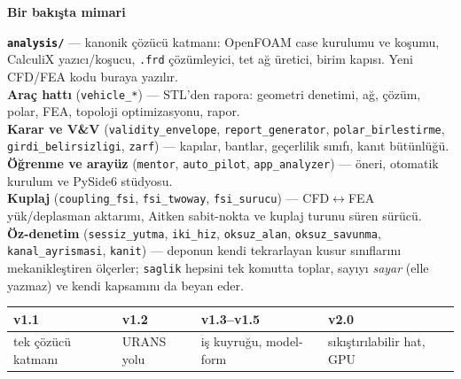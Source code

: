 \documentclass[11pt,a4paper]{article}
\newcommand{\kkkenar}{lacivert}
\newcommand{\kkzemin}{kod}
\newenvironment{renkkutu}[3]{%
  \renewcommand{\kkkenar}{#1}\renewcommand{\kkzemin}{#2}%
  \par\medskip\noindent
  \begin{lrbox}{\kutugovde}%
  \begin{minipage}{\dimexpr\linewidth-2\fboxsep-2\fboxrule\relax}\footnotesize
  \textcolor{#1}{\textbf{#3}}\par\vspace{3pt}%
}{%
  \end{minipage}%
  \end{lrbox}%
  \noindent\fcolorbox{\kkkenar}{\kkzemin}{\usebox{\kutugovde}}%
  \par\medskip
}
\newenvironment{anafikir}[1]{\begin{renkkutu}{lacivert}{kod}{#1}}{\end{renkkutu}}
\begin{document}
\begin{anafikir}{Bir bakışta mimari}
\textbf{\texttt{analysis/}} --- kanonik çözücü katmanı: OpenFOAM case kurulumu
ve koşumu, CalculiX yazıcı/koşucu, \texttt{.frd} çözümleyici, tet ağ üretici,
birim kapısı. Yeni CFD/FEA kodu buraya yazılır.\\[2pt]
\textbf{Araç hattı} (\texttt{vehicle\_*}) --- STL'den rapora: geometri
denetimi, ağ, çözüm, polar, FEA, topoloji optimizasyonu, rapor.\\[2pt]
\textbf{Karar ve V\&V} (\texttt{validity\_envelope}, \texttt{report\_generator},
\texttt{polar\_birlestirme}, \texttt{girdi\_belirsizligi}, \texttt{zarf}) ---
kapılar, bantlar, geçerlilik sınıfı, kanıt bütünlüğü.\\[2pt]
\textbf{Öğrenme ve arayüz} (\texttt{mentor}, \texttt{auto\_pilot},
\texttt{app\_analyzer}) --- öneri, otomatik kurulum ve PySide6 stüdyosu.\\[2pt]
\textbf{Kuplaj} (\texttt{coupling\_fsi}, \texttt{fsi\_twoway},
\texttt{fsi\_surucu}) --- CFD$\leftrightarrow$FEA yük/deplasman aktarımı,
Aitken sabit-nokta ve kuplaj turunu süren sürücü.\\[2pt]
\textbf{Öz-denetim} (\texttt{sessiz\_yutma}, \texttt{iki\_hiz}, \texttt{oksuz\_alan},
\texttt{oksuz\_savunma}, \texttt{kanal\_ayrismasi}, \texttt{kanit}) --- deponun
kendi tekrarlayan kusur sınıflarını mekanikleştiren ölçerler; \texttt{saglik}
hepsini tek komutta toplar, sayıyı \emph{sayar} (elle yazmaz) ve kendi kapsamını da beyan eder.
\end{anafikir}

\begin{center}\footnotesize
\begin{tabular}{@{}llll@{}}
\toprule
\textbf{v1.1} & \textbf{v1.2} & \textbf{v1.3--v1.5} & \textbf{v2.0} \\
\midrule
tek çözücü katmanı & URANS yolu & iş kuyruğu, model-form & sıkıştırılabilir
hat, GPU \\
\bottomrule
\end{tabular}
\end{center}
\end{document}
